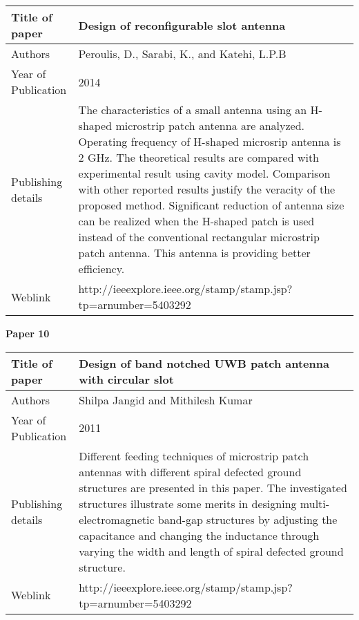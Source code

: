 	
		  \begin{center}
		  	\begin{table}[H]
		  		\centering
		  		\begin{tabular}{ |l|p{11cm}| }
		  			\hline
		  			Title of paper &  Design of reconfigurable slot antenna  \\
		  			\hline
		  			Authors & Peroulis, D., Sarabi, K., and Katehi, L.P.B \\
		  			\hline
		  			Year of Publication & 2014 \\
		  			\hline
		  			Publishing details & The characteristics of a small antenna using an H-shaped microstrip patch antenna are analyzed. Operating frequency of H-shaped microsrip antenna is 2 GHz. The theoretical results are compared with experimental result using cavity model. Comparison with other reported results justify the veracity of the proposed method. Significant reduction of antenna size can be realized when the H-shaped patch is used instead of the conventional rectangular microstrip patch antenna. This antenna is providing better efficiency.\\
		  			\hline
		  			Weblink & http://ieeexplore.ieee.org/stamp/stamp.jsp?tp=arnumber=5403292 \\
		  			\hline			 
		  		\end{tabular}		
		  		
		  	\end{table}
		  \end{center}
		  
			 	\begin{flushleft}
			 		\textbf{Paper 10}
			 	\end{flushleft}
			 	
		 
		 
		    \begin{center}
		    	\begin{table}[H]
		    		\centering
		    		\begin{tabular}{ |l|p{11cm}| }
		    			\hline
		    			Title of paper &  Design of band notched UWB patch antenna with circular slot  \\
		    			\hline
		    			Authors & Shilpa Jangid and Mithilesh Kumar \\
		    			\hline
		    			Year of Publication & 2011 \\
		    			\hline
		    			Publishing details & Different feeding techniques of microstrip patch antennas with different spiral defected ground structures are presented in this paper. The investigated structures illustrate some merits in designing multi-electromagnetic band-gap structures by adjusting the capacitance and changing the inductance through varying the width and length of spiral defected ground structure.\\
		    			\hline
		    			Weblink & http://ieeexplore.ieee.org/stamp/stamp.jsp?tp=arnumber=5403292 \\
		    			\hline			 
		    		\end{tabular}		
		    		
		    	\end{table}
		    \end{center}
		    
